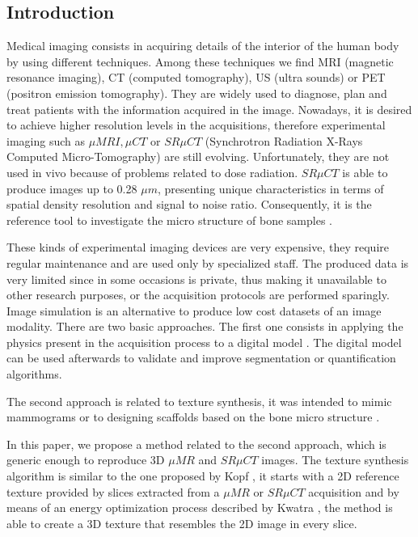
\subsection{Introduction}
\label{sec:intro}

Medical imaging consists in acquiring details of the interior of the human body by using different techniques. 
Among these techniques we find MRI (magnetic resonance imaging), CT (computed tomography),
US (ultra sounds) or PET (positron emission tomography). They are widely used to diagnose, plan and treat patients with the information acquired in the image.
Nowadays, it is desired to achieve higher resolution levels in the acquisitions,
therefore experimental imaging such as $\mu{MRI}, \mu{CT}$ or $SR \mu{CT}$ (Synchrotron Radiation X-Rays Computed Micro-Tomography) 
are still evolving. Unfortunately, they are not used in vivo because of problems related to dose radiation.
$SR \mu{CT}$ is able to produce images up to 0.28 $\mu{m}$, presenting
unique characteristics in terms of spatial density resolution and signal to noise ratio.
Consequently, it is the reference tool to investigate the micro structure of bone samples \cite{revol2002}.

These kinds of experimental imaging devices are very expensive, they require regular maintenance and are used only by specialized staff. 
The produced data is very limited since in some occasions is private, thus making it unavailable to other research purposes, 
or the acquisition protocols are performed sparingly. Image simulation is an alternative to produce low cost datasets of an image modality. 
There are two basic approaches. The first one consists in 
applying the physics present in the acquisition process to a digital model \cite{CHAR-09}.
The digital model can be used afterwards to validate and improve segmentation or quantification algorithms.

The second approach is related to texture synthesis, it was intended to mimic mammograms \cite{Castella:08} or
to designing scaffolds based on the bone micro structure \cite{DBLP:conf/smi/HoldsteinFPB09}. %

In this paper, we propose a method related to the second approach, which is generic enough to reproduce 3D $\mu{MR}$ and $SR \mu{CT}$ images. 
The texture synthesis algorithm is similar to the one proposed by Kopf \cite{KFCODLW07}, it starts with a 2D reference texture
provided by slices extracted from a $\mu{MR}$ or $SR \mu{CT}$ acquisition and by means of an energy optimization process 
described by Kwatra \cite{kwatra:2005:SIGGRAPH}, the method is able to create a 3D texture that resembles the 2D image in every slice.

